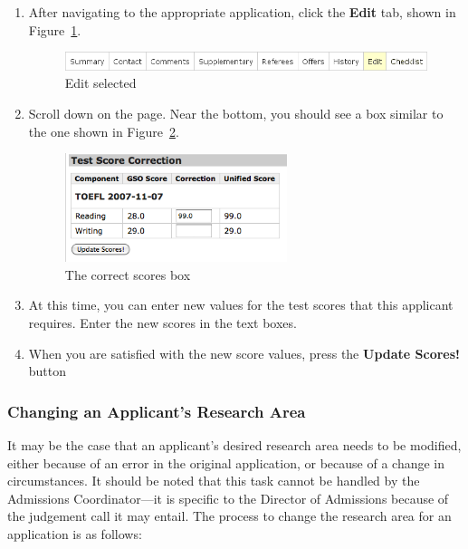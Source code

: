 \documentclass[titlepage]{article}
\begin{document}
\begin{enumerate}
\item After navigating to the appropriate application, click the
  \textbf{\textsf{Edit}} tab, shown in Figure~\ref{tCorrect1}.

\begin{figure}[h!]
  \begin{center}
  \includegraphics[width=13cm]{apptabs_edit.png}
  \end{center}
  \caption{Edit selected}
  \label{tCorrect1}
\end{figure}

\item Scroll down on the page. Near the bottom, you should see a box similar to the one shown in Figure~\ref{tCorrect2}.

\begin{figure}[h!]
  \begin{center}
  \includegraphics[width=6.5cm]{correct_scores.png}
  \end{center}
  \caption{The correct scores box}
  \label{tCorrect2}
\end{figure}

\item At this time, you can enter new values for the test scores that this applicant requires. Enter the new scores in the text boxes.
\item  When you are satisfied with the new score values, press the \textbf{\textsf{Update Scores!}} button

\end{enumerate}

\subsubsection{Changing an Applicant's Research Area}

It may be the case that an applicant's desired research area needs to be
modified, either because of an error in the original application, or because
of a change in circumstances. It should be noted that this task cannot be
handled by the Admissions Coordinator---it is specific to the Director of
Admissions because of the judgement call it may entail. The process to change
the research area for an application is as follows:
\end{document}
